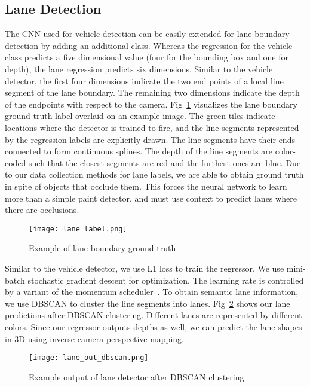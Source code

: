 \documentclass[journal]{IEEEtran}
\begin{document}
\subsection{Lane Detection}
The CNN used for vehicle detection can be easily extended for lane boundary detection by adding an additional class. Whereas the regression for the vehicle class predicts a five dimensional value (four for the bounding box and one for depth), the lane regression predicts six dimensions. Similar to the vehicle detector, the first four dimensions indicate the two end points of a local line segment of the lane boundary. The remaining two dimensions 
indicate the depth of the endpoints with respect to the camera. Fig~\ref{fig:lane-gt} visualizes the lane boundary ground truth label overlaid on an example image. The green tiles indicate locations where the detector is trained to fire, and the line segments represented by the regression labels are explicitly drawn. The line segments have their ends connected to form continuous splines. The depth of the line segments are color-coded such that the closest segments are red and the furthest ones are blue. Due to our data collection methods for lane labels, we are able to obtain ground truth in spite of objects that occlude them. This forces the neural network to learn more than a simple paint detector, and must use context to predict lanes where there are occlusions. 


\begin{figure}[tb]
  \centering
    \texttt{[image: lane\_label.png]}
 \caption{Example of lane boundary ground truth}
 \label{fig:lane-gt}
\end{figure}

Similar to the vehicle detector, we use L1 loss to train the regressor. We use mini-batch stochastic gradient descent for optimization. The learning rate is controlled by a variant of the momentum scheduler~\cite{sutskever-2013}. To obtain semantic lane information, we use DBSCAN to cluster the line segments into lanes. Fig~\ref{fig:lane-out-dbscan} shows our lane predictions after DBSCAN clustering. Different lanes are represented by different colors. Since our regressor outputs depths as well, we can predict the lane shapes in 3D using inverse camera perspective mapping.
 


\begin{figure}[tb]
  \centering
    \texttt{[image: lane\_out\_dbscan.png]}
 \caption{Example output of lane detector after DBSCAN clustering}
 \label{fig:lane-out-dbscan}
\end{figure}
\end{document}
